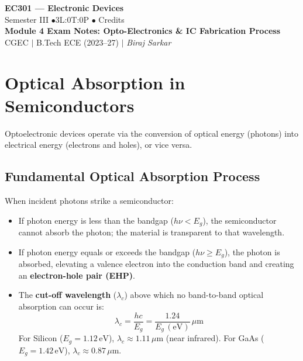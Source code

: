 \documentclass[12pt,a4paper]{article}
\begin{document}

\begin{center}
  {\LARGE\bfseries\color{myred} EC301 --- Electronic Devices}\\[5pt]
  {\normalsize\color{mydark} Semester III \quad$\bullet$\quad 3L:0T:0P \quad$\bullet$ Credits}\\[3pt]
  {\normalsize\color{myteal}\textbf{Module 4 Exam Notes: Opto-Electronics \& IC Fabrication Process}}\\[3pt]
  {\small\color{mydark} CGEC \;$|$\; B.Tech ECE (2023--27) \;$|$\; \textit{Biraj Sarkar}}
\end{center}
\vspace{2pt}
\noindent{\color{myred}\rule{\linewidth}{1.5pt}}
\vspace{2pt}

\hypersetup{linkcolor=mydark}
\tableofcontents
\hypersetup{linkcolor=myteal}
\newpage

\section{Optical Absorption in Semiconductors}

Optoelectronic devices operate via the conversion of optical energy (photons) into electrical energy (electrons and holes), or vice versa.

\subsection{Fundamental Optical Absorption Process}
When incident photons strike a semiconductor:
\begin{itemize}[leftmargin=*, itemsep=3pt]
  \item If photon energy is less than the bandgap ($h\nu < E_g$), the semiconductor cannot absorb the photon; the material is transparent to that wavelength.
  \item If photon energy equals or exceeds the bandgap ($h\nu \ge E_g$), the photon is absorbed, elevating a valence electron into the conduction band and creating an \textbf{electron-hole pair (EHP)}.
  \item The \textbf{cut-off wavelength} ($\lambda_c$) above which no band-to-band optical absorption can occur is:
  \begin{equation}
    \lambda_c = \frac{hc}{E_g} = \frac{1.24}{E_g\,(\text{eV})}\,\mu\text{m}
  \end{equation}
  For Silicon ($E_g = 1.12\,\text{eV}$), $\lambda_c \approx 1.11\,\mu\text{m}$ (near infrared). For GaAs ($E_g = 1.42\,\text{eV}$), $\lambda_c \approx 0.87\,\mu\text{m}$.
\end{itemize}
\end{document}
